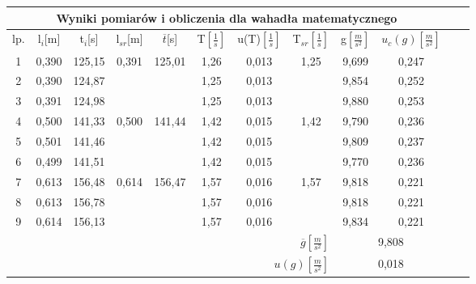 \documentclass[12pt]{article}
\begin{document}
\begin{table}[!htbp]
    \centering
    \begin{adjustbox}{width=1\textwidth}
    \begin{tabular}{|c|c|c|c|c|c|c|c|c|c|c|c|}
    \hline
    \multicolumn{10}{|c|}{Wyniki pomiarów i obliczenia dla wahadła matematycznego} \\
    \hline
    lp. & l$_i$[m] & t$_i$[s] & l$_{sr}$[m] & $\overline{t}$[s] & T$\left[ \frac{1}{s} \right]$ & u(T)$\left[\frac{1}{s}\right]$ & T$_{sr}\left[ \frac{1}{s} \right]$ & g$\left[ \frac{m}{s^2} \right]$ & $u_c(g) \left[ \frac{m}{s^2} \right] $
    \\[10pt] \hline
    1 & 0,390 & 125,15 & 0,391 & 125,01 & 1,26 & 0,013 & 1,25 & 9,699 & 0,247\\
    2 & 0,390 & 124,87 & ~ & ~ & 1,25          & 0,013 & ~     & 9,854 & 0,252\\
    3 & 0,391 & 124,98 & ~ & ~ & 1,25          & 0,013 & ~     & 9,880 & 0,253\\ \hline
    4 & 0,500 & 141,33 & 0,500 & 141,44 & 1,42 & 0,015 & 1,42  & 9,790 & 0,236\\
    5 & 0,501 & 141,46 & ~ & ~ & 1,42          & 0,015 & ~     & 9,809 & 0,237\\
    6 & 0,499 & 141,51 & ~ & ~ & 1,42          & 0,015 & ~     & 9,770 & 0,236\\ \hline
    7 & 0,613 & 156,48 & 0,614 & 156,47 & 1,57 & 0,016 & 1,57  & 9,818 & 0,221\\
    8 & 0,613 & 156,78 & ~ & ~ & 1,57          & 0,016 & ~     & 9,818 & 0,221\\
    9 & 0,614 & 156,13 & ~ & ~ & 1,57          & 0,016 & ~     & 9,834 & 0,221\\ \hline
    \multicolumn{8}{|r|}{$\overline{g} \left[ \frac{m}{s^2} \right]$} & \multicolumn{2}{|c|}{9,808} \\ \hline
    \multicolumn{8}{|r|}{$u(g) \left[ \frac{m}{s^2} \right]$} & \multicolumn{2}{|c|}{0,018} \\ \hline
    \end{tabular}
\end{adjustbox}
\end{table}
\end{document}
